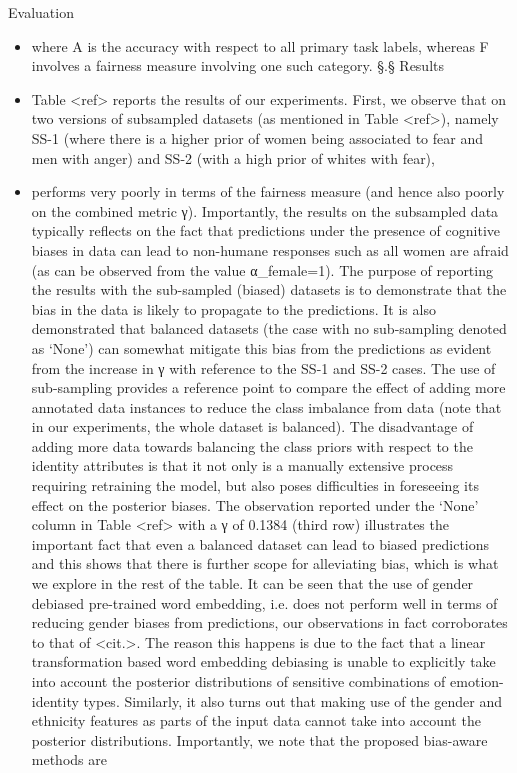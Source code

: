 \documentclass{beamer}
\begin{document}
\begin{frame}{Evaluation}
\begin{itemize}
\item
where A is the accuracy with respect to all primary task labels, whereas F involves a fairness measure involving one such category. §.§ Results
\item
Table <ref> reports the results of our experiments. First, we observe that on two versions of subsampled datasets (as mentioned in Table <ref>), namely SS-1 (where there is a higher prior of women being associated to fear and men with anger) and SS-2 (with a high prior of whites with fear),
\item
performs very poorly in terms of the fairness measure (and hence also poorly on the combined metric γ). Importantly, the results on the subsampled data typically reflects on the fact that predictions under the presence of cognitive biases in data can lead to non-humane responses such as all women are afraid (as can be observed from the value α_female=1). The purpose of reporting the results with the sub-sampled (biased) datasets is to demonstrate that the bias in the data is likely to propagate to the predictions. It is also demonstrated that balanced datasets (the case with no sub-sampling denoted as `None') can somewhat mitigate this bias from the predictions as evident from the increase in γ with reference to the SS-1 and SS-2 cases. The use of sub-sampling provides a reference point to compare the effect of adding more annotated data instances to reduce the class imbalance from data (note that in our experiments, the whole dataset is balanced). The disadvantage of adding more data towards balancing the class priors with respect to the identity attributes is that it not only is a manually extensive process requiring retraining the model, but also poses difficulties in foreseeing its effect on the posterior biases. The observation reported under the `None' column in Table <ref> with a γ of 0.1384 (third row) illustrates the important fact that even a balanced dataset can lead to biased predictions and this shows that there is further scope for alleviating bias, which is what we explore in the rest of the table. It can be seen that the use of gender debiased pre-trained word embedding, i.e. does not perform well in terms of reducing gender biases from predictions, our observations in fact corroborates to that of <cit.>. The reason this happens is due to the fact that a linear transformation based word embedding debiasing is unable to explicitly take into account the posterior distributions of sensitive combinations of emotion-identity types. Similarly, it also turns out that making use of the gender and ethnicity features as parts of the input data cannot take into account the posterior distributions. Importantly, we note that the proposed bias-aware methods are

\end{itemize}
\end{frame}
\end{document}
